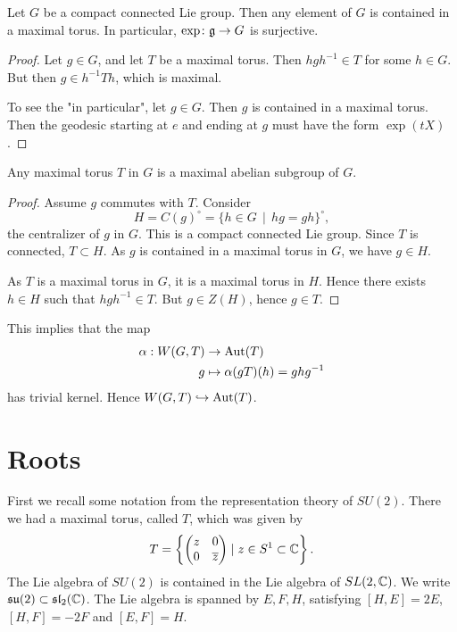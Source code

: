 \documentclass[11pt, english]{article}
\begin{document}
\begin{corr}
Let $G$ be a compact connected Lie group. Then any element of $G$ is contained in a maximal torus. In particular, $\exp \colon \mathfrak g  \to G$ is surjective.
\end{corr}

\begin{proof}
Let $g \in G$, and let $T$ be a maximal torus. Then $hgh^{-1} \in T$ for some $h \in G$. But then $g \in h^{-1}T h$, which is maximal. 

To see the "in particular", let $g \in G$. Then $g$ is contained in a maximal torus. Then the geodesic starting at $e$ and ending at $g$ must have the form $\exp(tX)$. 
\end{proof}

\begin{corr}
Any maximal torus $T$ in $G$ is a maximal abelian subgroup of $G$.
\end{corr}
\begin{proof}
Assume $g$ commutes with $T$. Consider
$$
H = C(g)^\circ = \{ h \in G \, \mid \, hg = gh \}^\circ,
$$
the centralizer of $g$ in $G$. This is a compact connected Lie group. Since $T$ is connected, $T \subset H$. As $g$ is contained in a maximal torus in $G$, we have $g \in H$. 

As $T$ is a maximal torus in $G$, it is a maximal torus in $H$. Hence there exists $h \in H$ such that $hgh^{-1} \in T$. But $g \in Z(H)$, hence $g \in T$.
\end{proof}


\begin{remark}
This implies that the map 
\begin{align*}
\alpha: W(G,T) &\to \operatorname{Aut}(T) \\
g &\mapsto  \alpha(gT)(h) = ghg^{-1}
\end{align*}
has trivial kernel. Hence $W(G,T) \hookrightarrow \operatorname{Aut}(T)$.
\end{remark}




\newpage
\section{Roots}

First we recall some notation from the representation theory of $SU(2)$. There we had a maximal torus, called $T$, which was given by
$$
T = \left\{ \begin{pmatrix} z & 0 \\ 0 & \overline z
\end{pmatrix} \mid z \in S^1 \subset \mathbb{C} \right\}.
$$
The Lie algebra of $SU(2)$ is contained in the Lie algebra of $SL(2,\mathbb{C})$. We write $\mathfrak{su}(2) \subset \mathfrak{sl}_2(\mathbb{C})$. The Lie algebra is spanned by $E,F,H$, satisfying $[H,E]=2E$, $[H,F]=-2F$ and $[E,F]=H$.
\end{document}

